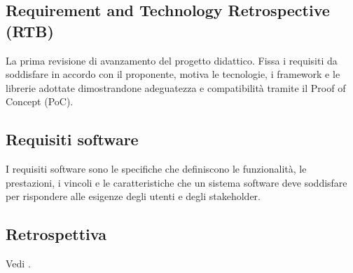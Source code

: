 \subsection*{Requirement and Technology Retrospective (RTB)}
La prima revisione di avanzamento del progetto didattico. Fissa i requisiti da soddisfare in accordo con il proponente, motiva le tecnologie, i framework 
e le librerie adottate dimostrandone adeguatezza e compatibilità tramite il Proof of Concept (PoC).

\hypertarget{sec:requisiti_software}{}
\subsection*{Requisiti software}
I requisiti software sono le specifiche che definiscono le funzionalità, le prestazioni, i vincoli e le caratteristiche che 
un sistema software deve soddisfare per rispondere alle esigenze degli utenti e degli stakeholder.

\subsection*{Retrospettiva}
Vedi .

\newpage